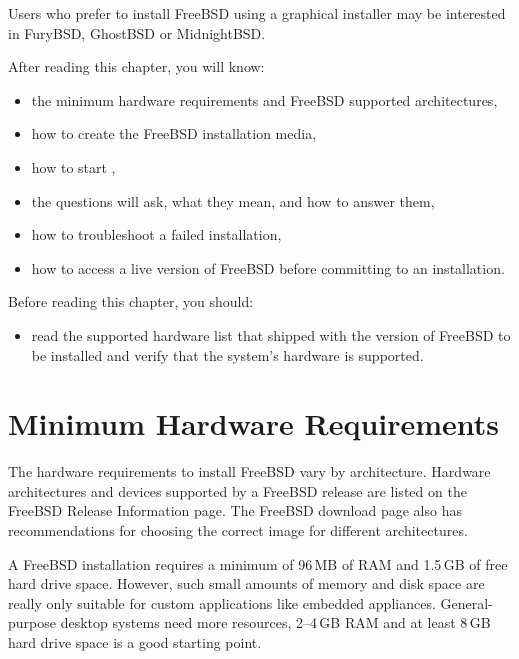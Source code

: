 \begin{note}
Users who prefer to install FreeBSD using a graphical installer may be interested in FuryBSD, GhostBSD or MidnightBSD.
\end{note}

After reading this chapter, you will know:
\begin{itemize}
\item
   the minimum hardware requirements and FreeBSD supported architectures,
\item
   how to create the FreeBSD installation media,
\item
   how to start ,
\item
   the questions  will ask, what they mean, and how to answer them,
\item
   how to troubleshoot a failed installation,
\item
   how to access a live version of FreeBSD before committing to an installation.
\end{itemize}
Before reading this chapter, you should:
\begin{itemize}
\item
   read the supported hardware list that shipped with the version of FreeBSD to be installed and verify that the system's hardware is supported.
\end{itemize}



\section{Minimum Hardware Requirements}

The hardware requirements to install FreeBSD vary by architecture.
Hardware architectures and devices supported by a FreeBSD release are listed on the FreeBSD Release Information page.
The FreeBSD download page also has recommendations for choosing the correct image for different architectures.

A FreeBSD installation requires a minimum of 96\,MB of RAM and 1.5\,GB of free hard drive space.
However, such small amounts of memory and disk space are really only suitable for custom applications like embedded appliances.
General-purpose desktop systems need more resources, 2--4\,GB RAM and at least 8\,GB hard drive space is a good starting point.

